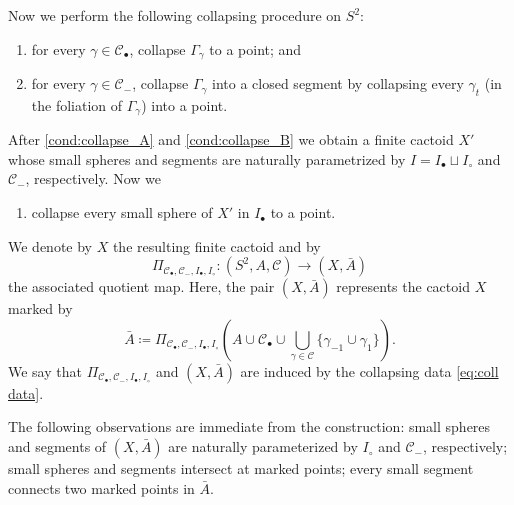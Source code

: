 \documentclass{amsart}
\theoremstyle{plain}
\theoremstyle{definition}
\theoremstyle{remark}
\newcommand{\CC}{{\mathcal C}}
\begin{document}
Now we perform the following collapsing procedure on $S^2$:
\begin{enumerate}[label=\text{(\Alph*)},font=\normalfont,leftmargin=*]
\item\label{cond:collapse_A} for every $\gamma\in \CC_\bullet$, collapse $\Gamma_\gamma$ to a point; and
\item\label{cond:collapse_B} for every $\gamma\in \CC_-$, collapse $\Gamma_\gamma$ into a closed segment by collapsing every $\gamma_{t}$ (in the foliation of $\Gamma_\gamma$) into a point.
\end{enumerate}
After \ref{cond:collapse_A} and \ref{cond:collapse_B} we obtain a finite cactoid $X'$ whose small spheres and segments are naturally parametrized by $I=I_\bullet \sqcup I_\circ$ and $\CC_-$, respectively. Now we
\begin{enumerate}[label=\text{(\Alph*)},font=\normalfont,leftmargin=*]
\addtocounter{enumi}{2}
\item\label{cond:collapse_C} %
collapse every small sphere of $X'$ in $I_\bullet$ to a point.
\end{enumerate}
We denote by $X$ the resulting finite cactoid and by
\begin{equation}
\label{eq:quot map} \Pi_{\CC_\bullet, \CC_- , I_\bullet,I_\circ}\colon  (S^2,A,\CC) \to (X,\bar A)
\end{equation} the associated quotient map. Here, the pair $(X, \bar A)$ represents the cactoid $X$ marked by 
\[\bar A \coloneq \Pi_{\CC_\bullet, \CC_- , I_\bullet,I_\circ} \left(A\cup \CC_\bullet \cup \bigcup_{\gamma\in \CC}  \{\gamma_{-1} \cup \gamma_{1}\} \right).\]
We say that $\Pi_{\CC_\bullet, \CC_- , I_\bullet,I_\circ}$ and $(X,\bar A)$ are induced by the collapsing data \eqref{eq:coll data}.


The following observations are immediate from the construction: %
small spheres and segments of $(X, \bar A)$ are naturally parameterized by $I_\circ$ and $\CC_-$, respectively;
small spheres and segments intersect at marked points; every small segment connects two marked points in $\bar A$. 
\end{document}
